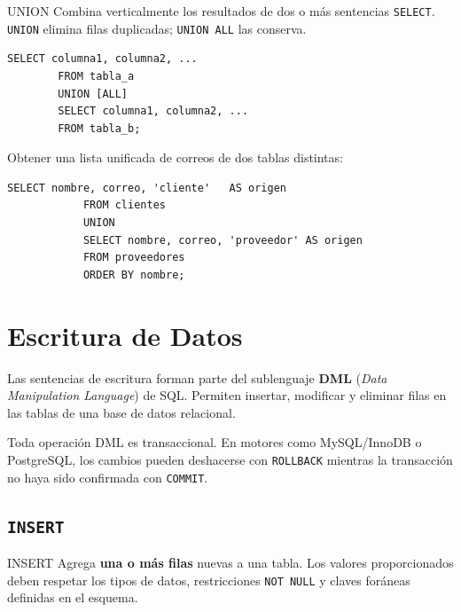 \documentclass[12pt, a4paper]{article}
\begin{document}
	\begin{definicion}{UNION}
		Combina verticalmente los resultados de dos o más sentencias \texttt{SELECT}.
		\texttt{UNION} elimina filas duplicadas; \texttt{UNION ALL} las conserva.
	\end{definicion}
	
	\begin{lstlisting}[style=sql, caption={Sintaxis de UNION / UNION ALL}]
		SELECT columna1, columna2, ...
		FROM tabla_a
		UNION [ALL]
		SELECT columna1, columna2, ...
		FROM tabla_b;
	\end{lstlisting}
	
	\begin{ejemplo}
		Obtener una lista unificada de correos de dos tablas distintas:
		
		\begin{lstlisting}[style=sql, caption={UNION de correos de clientes y proveedores}]
			SELECT nombre, correo, 'cliente'   AS origen
			FROM clientes
			UNION
			SELECT nombre, correo, 'proveedor' AS origen
			FROM proveedores
			ORDER BY nombre;
		\end{lstlisting}
	\end{ejemplo}
	
	
	\newpage
	\section{Escritura de Datos}
	
	Las sentencias de escritura forman parte del sublenguaje \textbf{DML}
	(\textit{Data Manipulation Language}) de SQL. Permiten insertar, modificar y
	eliminar filas en las tablas de una base de datos relacional.
	
	\begin{nota}
		Toda operación DML es transaccional. En motores como MySQL/InnoDB o PostgreSQL,
		los cambios pueden deshacerse con \texttt{ROLLBACK} mientras la transacción
		no haya sido confirmada con \texttt{COMMIT}.
	\end{nota}
	
	\subsection{\texttt{INSERT}}
	
	\begin{definicion}{INSERT}
		Agrega \textbf{una o más filas} nuevas a una tabla. Los valores proporcionados
		deben respetar los tipos de datos, restricciones \texttt{NOT NULL} y claves
		foráneas definidas en el esquema.
	\end{definicion}
	
\end{document}
